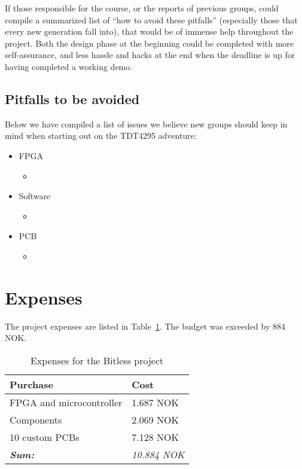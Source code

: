 If those responsible for the course, or the reports of previous groups, could
compile a summarized list of ``how to avoid these pitfalls'' (especially those
that every new generation fall into), that would be of immense help throughout
the project. Both the design phase at the beginning could be completed with more
self-assurance, and less hassle and hacks at the end when the deadline is up for
having completed a working demo.

\subsection{Pitfalls to be avoided}\label{conclusion:pitfalls}

Below we have compiled a list of issues we believe new groups should keep in
mind when starting out on the TDT4295 adventure:

\begin{itemize}
	\item FPGA
	\begin{itemize}
		\item
	\end{itemize}
	\item Software
	\begin{itemize}
		\item
	\end{itemize}
	\item PCB
	\begin{itemize}
		\item
	\end{itemize}
\end{itemize}

\clearpage
\section{Expenses}
The project expenses are listed in Table~\ref{tab:budget}. The budget was exceeded by 884 NOK.

\begin{table}[H]
	\centering
	\begin{tabular}{|l|l|}
		\hline
		\textbf{Purchase} & \textbf{Cost} \\
		\hline
		\hline
		FPGA and microcontroller & 1.687 NOK\\
		\hline
		Components & 2.069 NOK\\
		\hline
		10 custom PCBs & 7.128 NOK \\
		\hline
		\hline
		\textbf{\textit{Sum:}} & \textit{10.884 NOK}\\
		\hline
	\end{tabular}
	\caption{Expenses for the Bitless project}
	\label{tab:budget}
\end{table}

